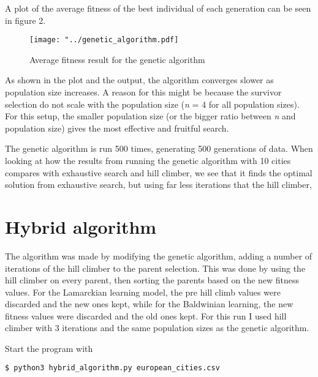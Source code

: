 \documentclass{article}
\begin{document}
\noindent
A plot of the average fitness of the best individual of each generation can be seen in figure 2.
\begin{figure}[H]
\begin{center}
\texttt{[image: "../genetic\_algorithm.pdf]}
\caption{Average fitness result for the genetic algorithm}
\end{center}
\end{figure}
\noindent
As shown in the plot and the output, the algorithm converges slower as population size increases. A reason for this might be because the survivor selection do not scale with the population size (\textit{n} = 4 for all population sizes). For this setup, the smaller population size (or the bigger ratio between \textit{n} and population size) gives the most effective and fruitful search.

The genetic algorithm is run 500 times, generating 500 generations of data. When looking at how the results from running the genetic algorithm with 10 cities compares with exhaustive search and hill climber, we see that it finds the optimal solution from exhaustive search, but using far less iterations that the hill climber,
\section{Hybrid algorithm}
The algorithm was made by modifying the genetic algorithm, adding a number of iterations of the hill climber to the parent selection. This was done by using the hill climber on every parent, then sorting the parents based on the new fitness values. For the Lamarckian learning model, the pre hill climb values were discarded and the new ones kept, while for the Baldwinian learning, the new fitness values were discarded and the old ones kept. For this run I used hill climber with 3 iterations and the same population sizes as the genetic algorithm.

Start the program with
\begin{lstlisting}[language=bash]
	$ python3 hybrid_algorithm.py european_cities.csv 
\end{lstlisting}
\end{document}
